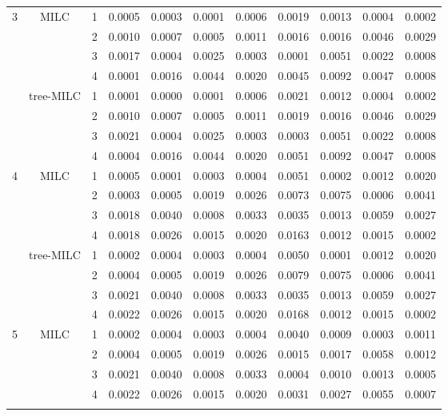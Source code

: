 \documentclass[a4paper, 11pt]{article} %
\begin{document}
\begin{table}[ht]
\begin{tabular}{cc r llll  rrrr }
 \hline
    \hline
  \multirow{8}{*}{3}
   & \multirow{4}{*}{MILC}
&  1
& 0.0005 & 0.0003 & 0.0001 & 0.0006
& 0.0019 & 0.0013 & 0.0004 & 0.0002 \\ 
 && 2 
& 0.0010 & 0.0007 & 0.0005 & 0.0011
& 0.0016 & 0.0016 & 0.0046 & 0.0029 \\
  &&3
  & 0.0017 & 0.0004 & 0.0025 & 0.0003 
 & 0.0001 & 0.0051 & 0.0022 & 0.0008 \\  
  && 4 
  & 0.0001 & 0.0016 & 0.0044 & 0.0020 
 & 0.0045 & 0.0092 & 0.0047 & 0.0008 \\ 
 \cline{2-11}

   & \multirow{4}{*}{tree-MILC}
   &1
& 0.0001 & 0.0000 & 0.0001 & 0.0006
& 0.0021 & 0.0012 & 0.0004 & 0.0002 \\
  &&2
& 0.0010 & 0.0007 & 0.0005 & 0.0011
& 0.0019 & 0.0016 & 0.0046 & 0.0029 \\
  &&3 
&  0.0021 & 0.0004 & 0.0025 & 0.0003 
 & 0.0003 & 0.0051 & 0.0022 & 0.0008 \\ 
  &&4 
& 0.0004 & 0.0016 & 0.0044 & 0.0020 
 & 0.0051 & 0.0092 & 0.0047 & 0.0008 \\ 
    \hline
    \hline
    \multirow{8}{*}{4}
   & \multirow{4}{*}{MILC}
  &  1
& 0.0005 & 0.0001 & 0.0003 & 0.0004
& 0.0051 & 0.0002 & 0.0012 & 0.0020 \\ 
 && 2 
 & 0.0003 & 0.0005 & 0.0019 & 0.0026
 & 0.0073 & 0.0075 & 0.0006 & 0.0041 \\ 
  &&3
  & 0.0018 & 0.0040 & 0.0008 & 0.0033 
  & 0.0035 & 0.0013 & 0.0059 & 0.0027 \\
  &&4
& 0.0018 & 0.0026 & 0.0015 & 0.0020
 & 0.0163 & 0.0012 & 0.0015 & 0.0002 \\
 \cline{2-11}

   & \multirow{4}{*}{tree-MILC}
   &1
 & 0.0002 & 0.0004 & 0.0003 & 0.0004 
& 0.0050 & 0.0001 & 0.0012 & 0.0020 \\
  &&2
 & 0.0004 & 0.0005 & 0.0019 & 0.0026 
& 0.0079 & 0.0075 & 0.0006 & 0.0041 \\ 
  &&3 
 & 0.0021 & 0.0040 & 0.0008 & 0.0033 
& 0.0035 & 0.0013 & 0.0059 & 0.0027 \\
  &&4 
& 0.0022 & 0.0026 & 0.0015 & 0.0020
 & 0.0168 & 0.0012 & 0.0015 & 0.0002 \\
    \hline
   \multirow{8}{*}{5}
   & \multirow{4}{*}{MILC}
&  1
& 0.0002 & 0.0004 & 0.0003 & 0.0004 
& 0.0040 & 0.0009 & 0.0003 & 0.0011 \\ 
 && 2 
 & 0.0004 & 0.0005 & 0.0019 & 0.0026
& 0.0015 & 0.0017 & 0.0058 & 0.0012 \\ 
  &&3
 & 0.0021 & 0.0040 & 0.0008 & 0.0033
  & 0.0004 & 0.0010 & 0.0013 & 0.0005 \\ 
  &&4
& 0.0022 & 0.0026 & 0.0015 & 0.0020 
 & 0.0031 & 0.0027 & 0.0055 & 0.0007 \\ 
 \cline{2-11}


\end{tabular}
\end{table}
\end{document}
